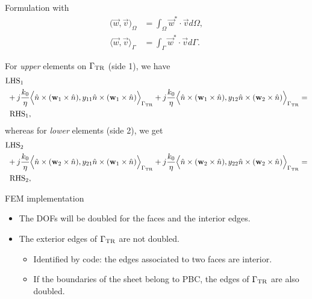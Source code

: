 \begin{frame}[allowframebreaks]{Formulation}
  with
  \begin{align}
    \Big(\vec{w},\vec{v}\Big)_\Omega &= \int_\Omega \vec{w}^* \cdot \vec{v} d\Omega, \nonumber\\
    \Big\langle \vec{w},\vec{v}\Big\rangle_{\Gamma} &= \int_\Gamma \vec{w}^* \cdot \vec{v} d\Gamma.\nonumber
  \end{align}
  
  \framebreak %
  For \emph{upper} elements on $\Gamma_{\rm TR}$ (side 1), we have
  \small
  \begin{align*}
    &{\rm LHS_1} \\
    &\; + j\frac{k_0}{\eta}\Big\langle\hat{n}\times(\vec{w}_1\times\hat{n}),y_{11}\hat{n}\times(\vec{w}_1\times\hat{n})\Big\rangle_{\Gamma_{\text{TR}}} + j\frac{k_0}{\eta}\Big\langle\hat{n}\times(\vec{w}_1\times\hat{n}),y_{12}\hat{n}\times(\vec{w}_2\times\hat{n})\Big\rangle_{\Gamma_{\text{TR}}} = \\
    &\;\;{\rm RHS_1},
  \end{align*}
  \normalfont
  whereas for \emph{lower} elements (side 2), we get
  \small
  \begin{align*}
    &{\rm LHS_2} \\
    &\; + j\frac{k_0}{\eta}\Big\langle\hat{n}\times(\vec{w}_2\times\hat{n}),y_{21}\hat{n}\times(\vec{w}_1\times\hat{n})\Big\rangle_{\Gamma_{\text{TR}}} + j\frac{k_0}{\eta}\Big\langle\hat{n}\times(\vec{w}_2\times\hat{n}),y_{22}\hat{n}\times(\vec{w}_2\times\hat{n})\Big\rangle_{\Gamma_{\text{TR}}} = \\
    &\;\;{\rm RHS_2},
  \end{align*}
  \normalfont
\end{frame}

\begin{frame}{FEM implementation}
  \begin{itemize}
    \item The DOFs will be doubled for the faces and the interior edges.
    \item The exterior edges of $\Gamma_{\rm TR}$ are not doubled.
    \begin{itemize}
      \item Identified by code: the edges associated to two faces are interior. 
      \item If the boundaries of the sheet belong to PBC, the edges of $\Gamma_{\rm TR}$ are also doubled.
    \end{itemize}
  \end{itemize}
\end{frame}

